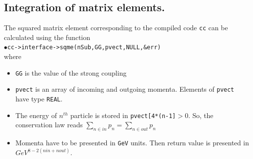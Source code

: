 \documentclass[12pt,a4paper]{article}
\begin{document}
\subsection{ Integration of matrix elements.} 
\label{sec:SQMEint} 
The squared matrix element  corresponding  to the compiled code {\tt cc} can be  calculated using  the function\\
$\bullet$\verb|cc->interface->sqme(nSub,GG,pvect,NULL,&err)|\\
where
\begin{itemize}
\item {\tt GG} is the value of the  strong coupling
\item {\tt pvect}
is an array of incoming and outgoing momenta. 
Elements of {\tt pvect} have type {\tt REAL}.
\item  The energy  of $n^{th}$ particle  is stored in  {\tt pvect[4*(n-1]}$>0$. So, the conservation law reads $\sum_{n\in in} p_n=\sum_{n\in out} p_n $ 
\item Momenta have to be presented in {\tt GeV} units. Then  return value is presented in  $GeV^{8-2(nin+nout)}$. 
 \end{itemize}
\end{document}
